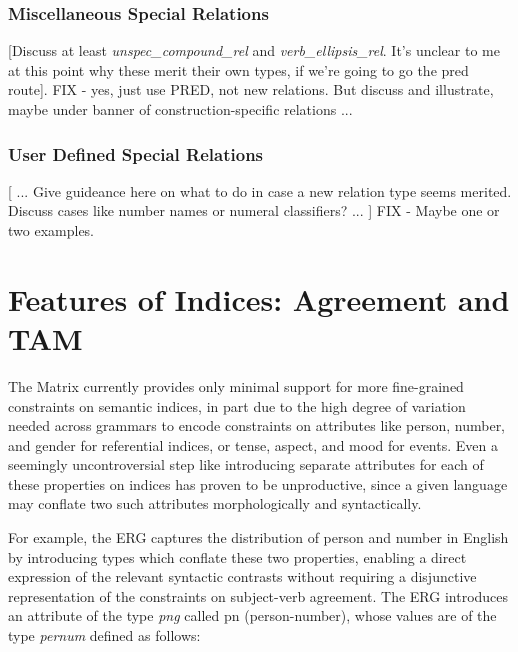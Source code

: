 \documentclass[12pt]{article}
\begin{document}
\subsubsection{Miscellaneous Special Relations}

[Discuss at least {\it unspec\_compound\_rel} and
{\it verb\_ellipsis\_rel}.  It's unclear to me at this point
why these merit their own types, if we're going to go the
{\sc pred} route].
FIX - yes, just use PRED, not new relations.  But discuss and illustrate,
maybe under banner of construction-specific relations ...

\subsubsection{User Defined Special Relations}

[ ... Give guideance here on what to do in case a new relation type
seems merited.  Discuss cases like number names or numeral classifiers? ... ]
FIX - Maybe one or two examples.

\section{Features of Indices: Agreement and TAM}
\label{AgrTAM}

The Matrix currently provides only minimal support for more fine-grained
constraints on semantic indices, in part due to the high degree of variation
needed across grammars to encode constraints on attributes like person, number,
and gender for referential indices, or tense, aspect, and mood for events.
Even a seemingly uncontroversial step like introducing separate attributes for 
each of these properties on indices has proven to be unproductive, since
a given language may conflate two such attributes morphologically and
syntactically.

For example, the ERG captures the distribution of person and number in English
by introducing types which conflate these two properties, enabling a direct
expression of the relevant syntactic contrasts without requiring a disjunctive
representation of the constraints on subject-verb agreement.  The ERG 
introduces an attribute of the type {\it png} called {\sc pn} (person-number),
whose values are of the type {\it pernum} defined as follows:\\
\end{document}
